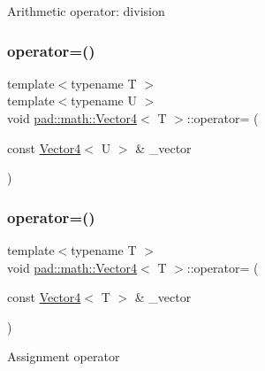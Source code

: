 Arithmetic operator\+: division \mbox{\label{structpad_1_1math_1_1_vector4_a4b379b87ccdaa94f49cb31c017fedd4f}} 
\subsubsection{\texorpdfstring{operator=()}{operator=()}\hspace{0.1cm}{\footnotesize\ttfamily [1/3]}}
{\footnotesize\ttfamily template$<$typename T $>$ \\
template$<$typename U $>$ \\
void \mbox{\hyperlink{structpad_1_1math_1_1_vector4}{pad\+::math\+::\+Vector4}}$<$ T $>$\+::operator= (\begin{DoxyParamCaption}\item[{const \mbox{\hyperlink{structpad_1_1math_1_1_vector4}{Vector4}}$<$ U $>$ \&}]{\+\_\+vector }\end{DoxyParamCaption})}

\mbox{\label{structpad_1_1math_1_1_vector4_ac705833566aae9930fa13586833a535b}} 
\subsubsection{\texorpdfstring{operator=()}{operator=()}\hspace{0.1cm}{\footnotesize\ttfamily [2/3]}}
{\footnotesize\ttfamily template$<$typename T $>$ \\
void \mbox{\hyperlink{structpad_1_1math_1_1_vector4}{pad\+::math\+::\+Vector4}}$<$ T $>$\+::operator= (\begin{DoxyParamCaption}\item[{const \mbox{\hyperlink{structpad_1_1math_1_1_vector4}{Vector4}}$<$ T $>$ \&}]{\+\_\+vector }\end{DoxyParamCaption})}

Assignment operator \mbox{\label{structpad_1_1math_1_1_vector4_aa8541807bf5c8c3a0b5edb851feb858a}} 

